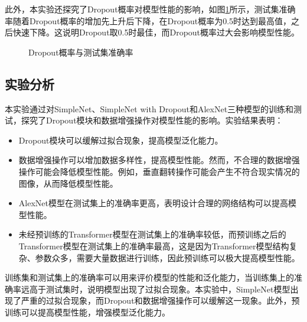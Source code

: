 此外，本实验还探究了Dropout概率对模型性能的影响，如图\ref{fig:dropout}所示，测试集准确率随着Dropout概率的增加先上升后下降，在Dropout概率为0.5时达到最高值，之后快速下降。这说明Dropout取0.5时最佳，而Dropout概率过大会影响模型性能。

\begin{figure}
    \centering
    \caption{Dropout概率与测试集准确率}
    \label{fig:dropout}
\end{figure}

\subsection{实验分析}

本实验通过对SimpleNet、SimpleNet with Dropout和AlexNet三种模型的训练和测试，探究了Dropout模块和数据增强操作对模型性能的影响。实验结果表明：

\begin{itemize}
    \item Dropout模块可以缓解过拟合现象，提高模型泛化能力。
    \item 数据增强操作可以增加数据多样性，提高模型性能。然而，不合理的数据增强操作可能会降低模型性能。例如，垂直翻转操作可能会产生不符合现实情况的图像，从而降低模型性能。
    \item AlexNet模型在测试集上的准确率更高，表明设计合理的网络结构可以提高模型性能。
    \item 未经预训练的Transformer模型在测试集上的准确率较低，而预训练之后的Transformer模型在测试集上的准确率最高，这是因为Transformer模型结构复杂、参数众多，需要大量数据进行训练，因此预训练可以极大提高模型性能。
\end{itemize}

训练集和测试集上的准确率可以用来评价模型的性能和泛化能力，当训练集上的准确率远高于测试集时，说明模型出现了过拟合现象。本实验中，SimpleNet模型出现了严重的过拟合现象，而Dropout和数据增强操作可以缓解这一现象。此外，预训练可以提高模型性能，增强模型泛化能力。
